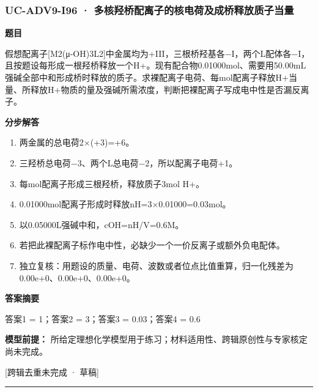 \documentclass[UTF8,11pt,a4paper]{ctexart}
\begin{document}
\subsubsection*{UC-ADV9-I96 · 多核羟桥配离子的核电荷及成桥释放质子当量}
\noindent\textbf{题目}\par
假想配离子[M2(μ-OH)3L2]中金属均为+III，三根桥羟基各−I，两个L配体各−I，且按题设每形成一根羟桥释放一个H+。现有配合物0.01000mol、需要用50.00mL强碱全部中和形成桥时释放的质子。求裸配离子电荷、每mol配离子释放H+当量、所释放H+物质的量及强碱所需浓度，判断把裸配离子写成电中性是否漏反离子。\par
\medskip\noindent\textbf{分步解答}
\begin{enumerate}
\item 两金属的总电荷2×(+3)=+6。
\item 三羟桥总电荷−3、两个L总电荷−2，所以配离子电荷+1。
\item 每mol配离子形成三根羟桥，释放质子3mol H+。
\item 0.01000mol配离子形成时释放nH=3×0.01000=0.03mol。
\item 以0.05000L强碱中和，cOH=nH/V=0.6M。
\item 若把此裸配离子标作电中性，必缺少一个一价反离子或额外负电配体。
\item 独立复核：用题设的质量、电荷、波数或者位点比值重算，归一化残差为0.00e+0、0.00e+0、0.00e+0。
\end{enumerate}
\noindent\textbf{答案摘要}\par
答案1 = 1；答案2 = 3；答案3 = 0.03；答案4 = 0.6\par
\noindent\textbf{模型前提：}
所给定理想化学模型用于练习；材料适用性、跨辑原创性与专家核定尚未完成。\par
\noindent\textcolor{red!65!black}{[跨辑去重未完成 · 草稿]} \par
\medskip\hrule\medskip
{}
\end{document}
